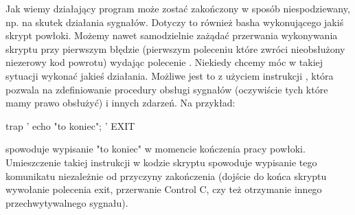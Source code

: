 Jak wiemy działający program może zostać zakończony w sposób niespodziewany, np. na skutek działania sygnałów.
Dotyczy to również basha wykonującego jakiś skrypt powłoki.
Możemy nawet samodzielnie zażądać przerwania wykonywania skryptu przy pierwszym błędzie (pierwszym poleceniu które zwróci nieobsłużony niezerowy kod powrotu) wydając polecenie .
Niekiedy chcemy móc w takiej sytuacji wykonać jakieś działania.
Możliwe jest to z użyciem instrukcji , która pozwala na zdefiniowanie procedury obsługi sygnałów (oczywiście tych które mamy prawo obsłużyć) i innych zdarzeń. Na przykład:

\begin{CodeFrame*}[bash]{}
trap '{ echo "to koniec"; }' EXIT
\end{CodeFrame*}

\noindent
spowoduje wypisanie "to koniec" w momencie kończenia pracy powłoki.
Umieszczenie takiej instrukcji w kodzie skryptu spowoduje wypisanie tego komunikatu niezależnie od przyczyny zakończenia (dojście do końca skryptu wywołanie polecenia exit, przerwanie Control C, czy też otrzymanie innego przechwytywalnego sygnału).

% 
% 
% 

